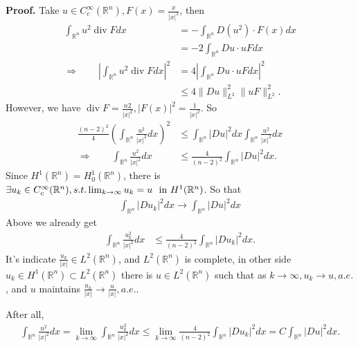\documentclass[a4paper]{book}
\newenvironment{eproof}
{\noindent\textbf{Proof.}}
{\qedhere}
\numberwithin{equation}{chapter}
\theoremstyle{definition}
\begin{document}
\begin{eproof}
  Take $u \in C_c^\infty(\mathbb{R}^n), F(x) = \frac{x}{\left| x \right|^2}$, then
  \begin{align*}
    \int_{\mathbb{R}^n} u^2 \operatorname{div} F dx &= - \int_{\mathbb{R}^n} D(u^2) \cdot F(x) dx \\
                                      &= - 2\int_{\mathbb{R}^n} Du \cdot uF dx \\
    \Longrightarrow \qquad \left| \int_{\mathbb{R}^n} u^2 \operatorname{div} F dx \right|^2 &= 4 \left| \int_{\mathbb{R}^n} Du \cdot uF dx \right|^2 \\
    & \leq 4 \| Du \|_{L^2}^2 \| uF \|_{L^2}^2.
  \end{align*}
  However, we have $\operatorname{div} F = \frac{n  2}{\left| x \right|^2}, \left| F(x) \right|^2 = \frac{1}{\left| x \right|^2}$. So
  \begin{align*}
    \frac{(n-2)^2}{4} (\int_{\mathbb{R}^n} \frac{u^2}{\left| x \right|^2} dx)^2 &\leq \int_{\mathbb{R}^n} \left| Du \right|^2 dx \int_{\mathbb{R}^n} \frac{u^2}{\left| x \right|^2} dx \\
    \Longrightarrow \qquad \int_{\mathbb{R}^n} \frac{u^2}{\left| x \right|^2} dx &\leq \frac{4}{(n-2)^2} \int_{\mathbb{R}^n} \left| Du \right|^2 dx .
  \end{align*}
  Since $H^1 (\mathbb{R}^n) = H_0^1(\mathbb{R}^n)$, there is $\exists u_k \in C_c^\infty(\mathbb{R}^n), s.t. \lim_{k \rightarrow \infty} u_k = u \ \textmd{ in } H^1(\mathbb{R}^n)$. So that
  \begin{align*}
    \int_{\mathbb{R}^n} \left| D u_k \right|^2 dx  \longrightarrow \int_{\mathbb{R}^n} \left| Du \right|^2 dx
  \end{align*}
  Above we already get
  \begin{align*}
    \int_{\mathbb{R}^n} \frac{u^2_k}{\left| x \right|^2} dx &\leq \frac{4}{(n-2)^2} \int_{\mathbb{R}^n} \left| Du_k \right|^2 dx .
  \end{align*}
  It's indicate $\frac{u_k}{\left| x \right|} \in L^2(\mathbb{R}^n)$, and $L^2(\mathbb{R}^n)$ is complete, in other side $u_k \in H^1(\mathbb{R}^n) \subset L^2(\mathbb{R}^n)$ there is $u \in L^2(\mathbb{R}^n)$ such that as $k \rightarrow \infty, u_k \rightarrow u, a.e. $, and $u$ maintains $ \frac{u_k}{\left| x \right|} \rightarrow \frac{u}{\left| x \right|}, a.e. $.

  After all,
  \begin{align*}
    \int_{\mathbb{R}^n} \frac{u^2}{\left| x \right|^2} dx = \lim_{k \rightarrow \infty} \int_{\mathbb{R}^n} \frac{u_k^2}{\left| x \right|^2} dx \leq \lim_{k \rightarrow \infty} \frac{4}{(n-2)^2} \int_{\mathbb{R}^n} \left| Du_k \right|^2 dx = C\int_{\mathbb{R}^n} \left| Du \right|^2 dx.
  \end{align*}
\end{eproof}
\end{document}
